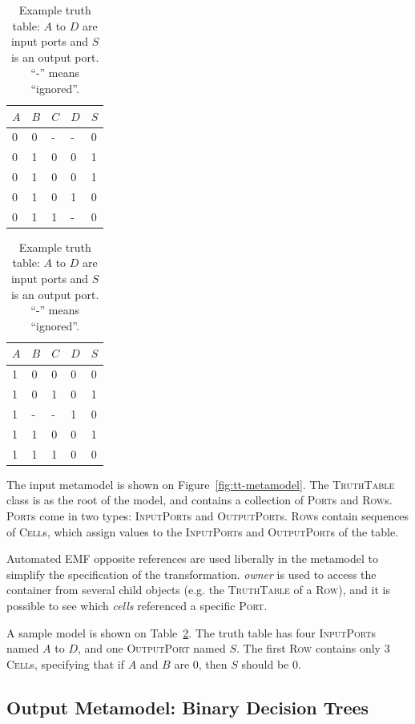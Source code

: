 \documentclass[a4paper]{article}
\newcommand*{\class}[1]{\textsc{#1}}
\newcommand*{\feature}[1]{\emph{#1}}
\begin{document}
\begin{table}
  \centering
  \begin{tabular}{llll|l}
    $A$ & $B$ & $C$ & $D$ & $S$ \\
    \hline
    0 & 0 & - & - & 0 \\
    0 & 1 & 0 & 0 & 1 \\
    0 & 1 & 0 & 0 & 1 \\
    0 & 1 & 0 & 1 & 0 \\
    0 & 1 & 1 & - & 0 \\
  \end{tabular}
  \hspace{1em}
  \begin{tabular}{llll|l}
    $A$ & $B$ & $C$ & $D$ & $S$ \\
    \hline
    1 & 0 & 0 & 0 & 0 \\
    1 & 0 & 1 & 0 & 1 \\
    1 & - & - & 1 & 0 \\
    1 & 1 & 0 & 0 & 1 \\
    1 & 1 & 1 & 0 & 0 \\
  \end{tabular}
  \caption{Example truth table: $A$ to $D$ are input ports and $S$ is an output port. ``-'' means ``ignored''.}
  \label{tab:tt-example}
\end{table}

The input metamodel is shown on Figure~\ref{fig:tt-metamodel}. The
\class{Truth\-Table} class is as the root of the model, and contains a
collection of \class{Port}s and \class{Row}s. \class{Port}s come in two types:
\class{Input\-Port}s and \class{Output\-Port}s. \class{Row}s contain sequences
of \class{Cell}s, which assign values to the \class{Input\-Port}s and
\class{Output\-Port}s of the table.

Automated EMF opposite references are used liberally in the metamodel to
simplify the specification of the transformation. \feature{owner} is used to
access the container from several child objects (e.g. the \class{Truth\-Table}
of a \class{Row}), and it is possible to see which \feature{cells} referenced a
specific \class{Port}.

A sample model is shown on Table~\ref{tab:tt-example}. The truth table has four
\class{Input\-Port}s named $A$ to $D$, and one \class{Output\-Port} named $S$.
The first \class{Row} contains only 3 \class{Cell}s, specifying that if $A$ and
$B$ are 0, then $S$ should be 0.

\subsection{Output Metamodel: Binary Decision Trees}
\label{sec:outp-metam-binary}
\end{document}
